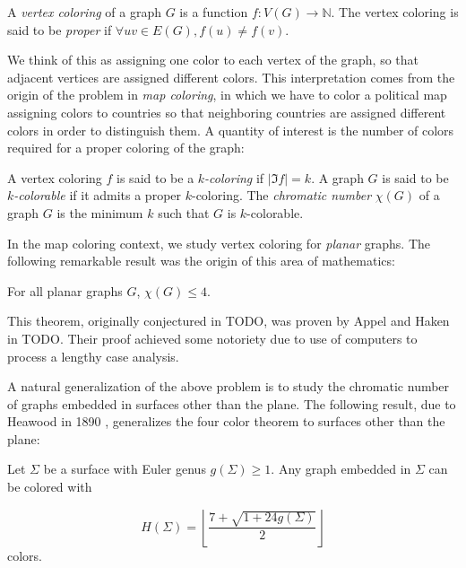 \begin{definition}
A \emph{vertex coloring} of a graph $G$ is a function $f : V(G) \rightarrow \mathbb{N}$. The vertex coloring is said to be \emph{proper} if $\forall uv \in E(G), f(u) \neq f(v)$. 
\end{definition}

We think of this as assigning one color to each vertex of the graph, so that adjacent vertices are assigned different colors. This interpretation comes from the origin of the problem in \textit{map coloring}, in which we have to color a political map assigning colors to countries so that neighboring countries are assigned different colors in order to distinguish them. A quantity of interest is the number of colors required for a proper coloring of the graph:

\begin{definition}
A vertex coloring $f$ is said to be a $k$\emph{-coloring} if $|\Im f| = k$. A graph $G$ is said to be $k$\emph{-colorable} if it admits a proper $k$-coloring. The \emph{chromatic number} $\chi(G)$ of a graph $G$ is the minimum $k$ such that $G$ is $k$-colorable. 
\end{definition}

In the map coloring context, we study vertex coloring for \emph{planar} graphs. The following remarkable result was the origin of this area of mathematics:

\begin{theorem}
For all planar graphs $G$, $\chi(G) \leq 4$.
\end{theorem}

This theorem, originally conjectured in TODO, was proven by Appel and Haken in TODO. Their proof achieved some notoriety due to use of computers to process a lengthy case analysis. 

A natural generalization of the above problem is to study the chromatic number of graphs embedded in surfaces other than the plane. The following result, due to Heawood in 1890 \cite{heawoodmapcolour}, generalizes the four color theorem to surfaces other than the plane:

\begin{theorem}[Heawood]
Let $\Sigma$ be a surface with Euler genus $g(\Sigma) \geq 1$. Any graph embedded in $\Sigma$ can be colored with

$$
H(\Sigma) = \left\lfloor \frac{7 + \sqrt{1+24g(\Sigma)}}{2} \right\rfloor
$$
colors.
\end{theorem}

